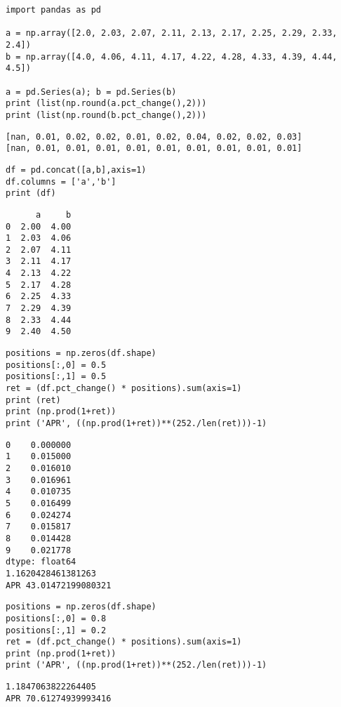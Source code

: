 \documentclass[12pt,fleqn]{article}\usepackage{../../common}
\begin{document}
\begin{verbatim}
import pandas as pd

a = np.array([2.0, 2.03, 2.07, 2.11, 2.13, 2.17, 2.25, 2.29, 2.33, 2.4])
b = np.array([4.0, 4.06, 4.11, 4.17, 4.22, 4.28, 4.33, 4.39, 4.44, 4.5])

a = pd.Series(a); b = pd.Series(b)
print (list(np.round(a.pct_change(),2)))
print (list(np.round(b.pct_change(),2)))
\end{verbatim}

\begin{verbatim}
[nan, 0.01, 0.02, 0.02, 0.01, 0.02, 0.04, 0.02, 0.02, 0.03]
[nan, 0.01, 0.01, 0.01, 0.01, 0.01, 0.01, 0.01, 0.01, 0.01]
\end{verbatim}


\begin{verbatim}
df = pd.concat([a,b],axis=1)
df.columns = ['a','b']
print (df)
\end{verbatim}

\begin{verbatim}
      a     b
0  2.00  4.00
1  2.03  4.06
2  2.07  4.11
3  2.11  4.17
4  2.13  4.22
5  2.17  4.28
6  2.25  4.33
7  2.29  4.39
8  2.33  4.44
9  2.40  4.50
\end{verbatim}

\begin{verbatim}
positions = np.zeros(df.shape)
positions[:,0] = 0.5
positions[:,1] = 0.5
ret = (df.pct_change() * positions).sum(axis=1)
print (ret)
print (np.prod(1+ret))
print ('APR', ((np.prod(1+ret))**(252./len(ret)))-1)
\end{verbatim}

\begin{verbatim}
0    0.000000
1    0.015000
2    0.016010
3    0.016961
4    0.010735
5    0.016499
6    0.024274
7    0.015817
8    0.014428
9    0.021778
dtype: float64
1.1620428461381263
APR 43.01472199080321
\end{verbatim}

\begin{verbatim}
positions = np.zeros(df.shape)
positions[:,0] = 0.8
positions[:,1] = 0.2
ret = (df.pct_change() * positions).sum(axis=1)
print (np.prod(1+ret))
print ('APR', ((np.prod(1+ret))**(252./len(ret)))-1)
\end{verbatim}

\begin{verbatim}
1.1847063822264405
APR 70.61274939993416
\end{verbatim}
\end{document}
